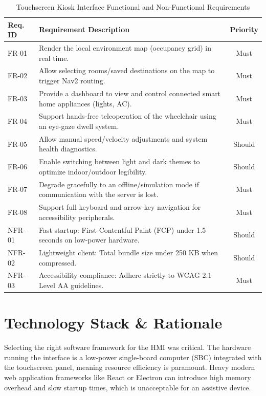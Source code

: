 \begin{table}[H]
\centering
\caption{Touchscreen Kiosk Interface Functional and Non-Functional Requirements}
\label{tab:kiosk-requirements}
\begin{tabularx}{\textwidth}{|l|>{\raggedright\arraybackslash}X|c|}
\hline
\textbf{Req. ID} & \textbf{Requirement Description} & \textbf{Priority} \\ \hline
FR-01 & Render the local environment map (occupancy grid) in real time. & Must \\ \hline
FR-02 & Allow selecting rooms/saved destinations on the map to trigger Nav2 routing. & Must \\ \hline
FR-03 & Provide a dashboard to view and control connected smart home appliances (lights, AC). & Must \\ \hline
FR-04 & Support hands-free teleoperation of the wheelchair using an eye-gaze dwell system. & Must \\ \hline
FR-05 & Allow manual speed/velocity adjustments and system health diagnostics. & Should \\ \hline
FR-06 & Enable switching between light and dark themes to optimize indoor/outdoor legibility. & Should \\ \hline
FR-07 & Degrade gracefully to an offline/simulation mode if communication with the server is lost. & Must \\ \hline
FR-08 & Support full keyboard and arrow-key navigation for accessibility peripherals. & Must \\ \hline
NFR-01 & Fast startup: First Contentful Paint (FCP) under 1.5 seconds on low-power hardware. & Should \\ \hline
NFR-02 & Lightweight client: Total bundle size under 250 KB when compressed. & Should \\ \hline
NFR-03 & Accessibility compliance: Adhere strictly to WCAG 2.1 Level AA guidelines. & Must \\ \hline
\end{tabularx}
\end{table}

\section{Technology Stack \& Rationale}
Selecting the right software framework for the HMI was critical. The hardware running the interface is a low-power single-board computer (SBC) integrated with the touchscreen panel, meaning resource efficiency is paramount. Heavy modern web application frameworks like React or Electron can introduce high memory overhead and slow startup times, which is unacceptable for an assistive device.

